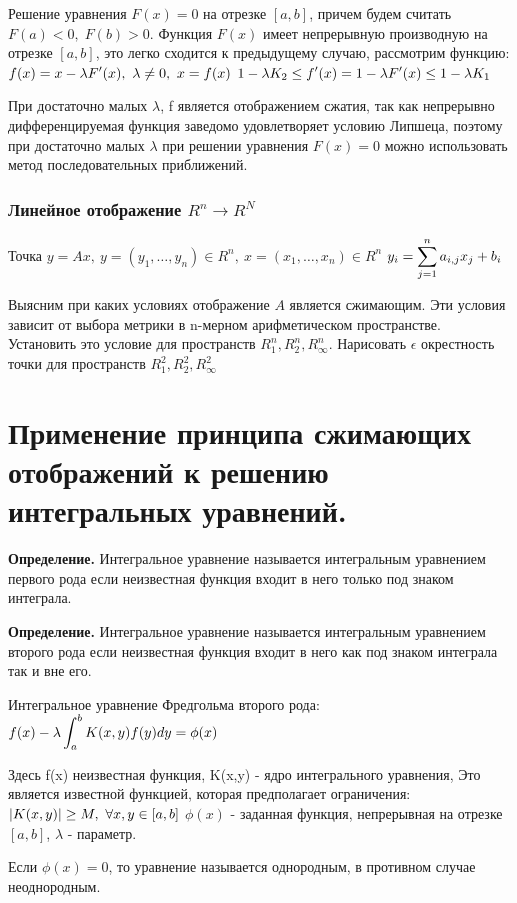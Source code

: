 \documentclass[12pt]{report}
\renewcommand{\[}{$\\\displaystyle}
\renewcommand{\]}{\\$}
\renewcommand{\[}{$\\\displaystyle}
\newcommand{\sep}{,\ }
\newcommand{\tdef}{\textbf{Определение.} }
\begin{document}
Решение уравнения $F(x)=0$ на отрезке $[a,b]$, причем будем считать $F(a)<0,\; F(b)>0$. Функция $F(x)$ имеет непрерывную производную на отрезке $[a,b]$, это легко сходится к предыдущему случаю, рассмотрим функцию:
\[ f(x)=x-\lambda F'(x)\sep \lambda \neq 0 \sep x=f(x)\]
\[ 1 - \lambda K_2 \leq f'(x) = 1 - \lambda F'(x) \leq 1 - \lambda K_1\]

При достаточно малых $\lambda$, f является отображением сжатия, так как непрерывно дифференцируемая функция заведомо удовлетворяет условию Липшеца, поэтому при достаточно малых $\lambda$ при решении уравнения $F(x)=0$ можно использовать метод последовательных приближений.

\subsubsection{Линейное отображение $R^n \rightarrow R^N$}

Точка $y=Ax\sep y=(y_1,\dots,y_n) \in R^n\sep x=(x_1,\dots,x_n) \in R^n$
\[ y_i=\sum_{j=1}^n a_{i,j}x_j+b_i\]

Выясним при каких условиях отображение $A$ является сжимающим. Эти условия зависит от выбора метрики в n-мерном арифметическом пространстве. Установить это условие для пространств $R_1^n,R_2^n,R_\infty^n$. Нарисовать $\epsilon$ окрестность точки для пространств $R_1^2,R_2^2,R_\infty^2$

\section{Применение принципа сжимающих отображений к решению интегральных уравнений.}

\tdef Интегральное уравнение называется интегральным уравнением первого рода если неизвестная функция входит в него только под знаком интеграла.

\tdef Интегральное уравнение называется интегральным уравнением второго рода если неизвестная функция входит в него как под знаком интеграла так и вне его.

Интегральное уравнение Фредгольма второго рода:
\[ f(x)-\lambda\int_a^bK(x,y)f(y)dy=\phi(x)\]

Здесь f(x) неизвестная функция, K(x,y) - ядро интегрального уравнения, Это является известной функцией, которая предполагает ограничения:
\[ |K(x,y)|\geq M\sep\forall x,y\in[a,b]\]
$\phi(x)$ - заданная функция, непрерывная на отрезке $[a,b]$, $\lambda$ - параметр.

Если $\phi(x) = 0$, то уравнение называется однородным, в противном случае неоднородным.
\end{document}
